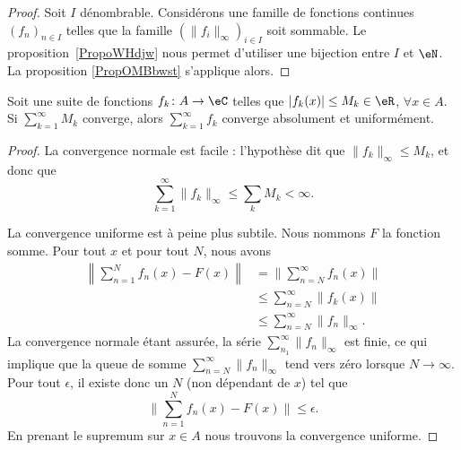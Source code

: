 \begin{proof}
	Soit \( I\) dénombrable. Considérons une famille de fonctions continues \( (f_n)_{n\in I}\) telles que la famille \( (\| f_i \|_{\infty})_{i\in I}\) soit sommable. Le proposition~\ref{PropoWHdjw} nous permet d'utiliser une bijection entre \( I\) et \( \eN\). La proposition \ref{PropOMBbwst} s'applique alors.
\end{proof}

\begin{theorem}		\label{ThoCritWeierstrass}
	Soit une suite de fonctions \( f_k\colon A\to \eC\) telles que \( | f_k(x) |\leq M_k\in\eR\), \( \forall x\in A\). Si \( \sum_{k=1}^{\infty}M_k\) converge, alors \( \sum_{k=1}^{\infty}f_k\) converge absolument et uniformément.
\end{theorem}

\begin{proof}
	La convergence normale est facile : l'hypothèse dit que \( \| f_k \|_{\infty}\leq M_k\), et donc que
	\begin{equation}
		\sum_{k=1}^{\infty}\| f_k \|_{\infty}\leq \sum_kM_k<\infty.
	\end{equation}

	La convergence uniforme est à peine plus subtile. Nous nommons \( F\) la fonction somme. Pour tout \( x\) et pour tout \( N\), nous avons
	\begin{subequations}
		\begin{align}
			\left\| \sum_{n=1}^Nf_n(x)-F(x) \right\| & =\| \sum_{n=N}^{\infty}f_n(x) \|            \\
			                                         & \leq\sum_{n=N}^{\infty}\| f_k(x) \|         \\
			                                         & \leq \sum_{n=N}^{\infty}\| f_n \|_{\infty}.
		\end{align}
	\end{subequations}
	La convergence normale étant assurée, la série \( \sum_{n_1}^{\infty}\| f_n \|_{\infty}\) est finie, ce qui implique que la queue de somme \( \sum_{n=N}^{\infty}\| f_n \|_{\infty}\) tend vers zéro lorsque \( N\to \infty\). Pour tout \( \epsilon\), il existe donc un \( N\) (non dépendant de \( x\)) tel que
	\begin{equation}
		\| \sum_{n=1}^Nf_n(x)-F(x) \|\leq \epsilon.
	\end{equation}
	En prenant le supremum sur \( x\in A\) nous trouvons la convergence uniforme.
\end{proof}

